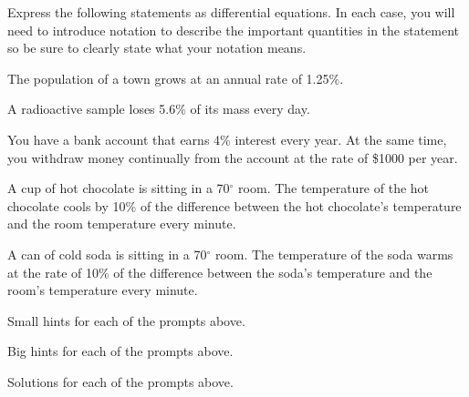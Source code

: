 \begin{activity} \label{A:7.1.1}  Express the following statements as
  differential equations.  In each case, you will need to introduce notation
  to describe the important quantities in the statement so be sure to 
  clearly state what your notation means.
\ba
	\item The population of a town grows at an annual rate of
          1.25\%. 
        \item A radioactive sample loses
          5.6\% of its mass every day.
        \item You have a bank account that earns 4\% interest every
          year.  At the same time, you withdraw money continually from
          the account at the rate of \$1000 per year.
        \item A cup of hot chocolate is sitting in a 70$^\circ$ room.
          The temperature of the hot chocolate cools by 10\% of
          the difference between the hot chocolate's temperature and
          the room temperature every minute.
        \item A can of cold soda is sitting in a 70$^\circ$ room.
          The temperature of the soda warms at the rate of 10\% of
          the difference between the soda's temperature and
          the room's temperature every minute.
\ea
\end{activity}
\begin{smallhint}
\ba
	\item Small hints for each of the prompts above.
\ea
\end{smallhint}
\begin{bighint}
\ba
	\item Big hints for each of the prompts above.
\ea
\end{bighint}
\begin{activitySolution}
\ba
	\item Solutions for each of the prompts above.
\ea
\end{activitySolution}
\aftera